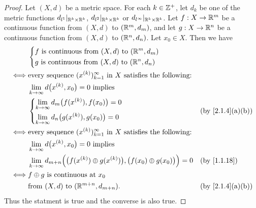 \begin{proof}
  Let \((X, d)\) be a metric space.
  For each \(k \in \mathbb{Z}^+\), let \(d_k\) be one of the metric functions \(d_{l^1}|_{\mathbb{R}^k \times \mathbb{R}^k}\), \(d_{l^2}|_{\mathbb{R}^k \times \mathbb{R}^k}\) or \(d_{l^\infty}|_{\mathbb{R}^k \times \mathbb{R}^k}\).
  Let \(f : X \to \mathbb{R}^m\) be a continuous function from \((X, d)\) to \((\mathbb{R}^m, d_m)\), and let \(g : X \to \mathbb{R}^n\) be a continuous function from \((X, d)\) to \((\mathbb{R}^n, d_n)\).
  Let \(x_0 \in X\).
  Then we have
  \begin{align*}
         & \begin{dcases}
             f \text{ is continuous from } (X, d) \text{ to } (\R^m, d_m) \\
             g \text{ is continuous from } (X, d) \text{ to } (\R^n, d_n)
           \end{dcases}                                                                                          \\
    \iff & \text{every sequence } (x^{(k)})_{k = 1}^\infty \text{ in } X \text{ satisfies the following:}                                                        \\
         & \lim_{k \to \infty} d\big(x^{(k)}, x_0\big) = 0 \text{ implies }                                                                                      \\
         & \begin{dcases}
             \lim_{k \to \infty} d_m\big(f(x^{(k)}), f(x_0)\big) = 0 \\
             \lim_{k \to \infty} d_n\big(g(x^{(k)}), g(x_0)\big) = 0
           \end{dcases}                                                        &  & \text{(by \cref{2.1.4}(a)(b))}                                               \\
    \iff & \text{every sequence } (x^{(k)})_{k = 1}^\infty \text{ in } X \text{ satisfies the following:}                                                        \\
         & \lim_{k \to \infty} d\big(x^{(k)}, x_0\big) = 0 \text{ implies }                                                                                      \\
         & \lim_{k \to \infty} d_{m + n}\Big(\big(f(x^{(k)}) \oplus g(x^{(k)})\big), \big(f(x_0) \oplus g(x_0)\big)\Big) = 0 &  & \by{1.1.18}                    \\
    \iff & f \oplus g \text{ is continuous at } x_0                                                                                                              \\
         & \text{from } (X, d) \text{ to } (\R^{m + n}, d_{m + n}).                                                          &  & \text{(by \cref{2.1.4}(a)(b))}
  \end{align*}
  Thus the statment is true and the converse is also true.
\end{proof}

